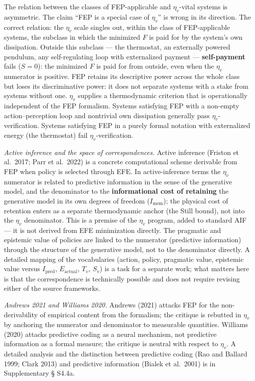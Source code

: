 \documentclass[pdflatex,sn-mathphys-ay]{sn-jnl}
\begin{document}
The relation between the classes of FEP-applicable and \(\eta_v\)-vital systems is asymmetric. The claim ``FEP is a special case of \(\eta_v\)'' is wrong in its direction. The correct relation: the \(\eta_v\) scale singles out, within the class of FEP-applicable systems, the subclass in which the minimized \(F\) is paid for by the system's own dissipation. Outside this subclass --- the thermostat, an externally powered pendulum, any self-regulating loop with externalized payment --- \textbf{self-payment} fails (\(S = 0\)): the minimized \(F\) is paid for from outside, even when the \(\eta_v\) numerator is positive. FEP retains its descriptive power across the whole class but loses its discriminative power: it does not separate systems with a stake from systems without one. \(\eta_v\) supplies a thermodynamic criterion that is operationally independent of the FEP formalism. Systems satisfying FEP with a non-empty action--perception loop and nontrivial own dissipation generally pass \(\eta_v\)-verification. Systems satisfying FEP in a purely formal notation with externalized energy (the thermostat) fail \(\eta_v\)-verification.

\emph{Active inference and the space of correspondences.} Active inference (Friston et al.~2017; Parr et al.~2022) is a concrete computational scheme derivable from FEP when policy is selected through EFE. In active-inference terms the \(\eta_v\) numerator is related to predictive information in the sense of the generative model, and the denominator to the \textbf{informational cost of retaining} the generative model in its own degrees of freedom (\(I_{\text{mem}}\)); the physical cost of retention enters as a separate thermodynamic anchor (the Still bound), not into the \(\eta_v\) denominator. This is a premise of the \(\eta_v\) program, added to standard AIF --- it is not derived from EFE minimization directly. The pragmatic and epistemic value of policies are linked to the numerator (predictive information) through the structure of the generative model, not to the denominator directly. A detailed mapping of the vocabularies (action, policy, pragmatic value, epistemic value versus \(I_{\text{pred}}\), \(E_{\text{actual}}\), \(T_v\), \(S_v\)) is a task for a separate work; what matters here is that the correspondence is technically possible and does not require revising either of the source frameworks.

\emph{Andrews 2021 and Williams 2020.} Andrews (2021) attacks FEP for the non-derivability of empirical content from the formalism; the critique is rebutted in \(\eta_v\) by anchoring the numerator and denominator to measurable quantities. Williams (2020) attacks predictive coding as a neural mechanism, not predictive information as a formal measure; the critique is neutral with respect to \(\eta_v\). A detailed analysis and the distinction between predictive coding (Rao and Ballard 1999; Clark 2013) and predictive information (Bialek et al.~2001) is in Supplementary § S4.4a.
\end{document}
